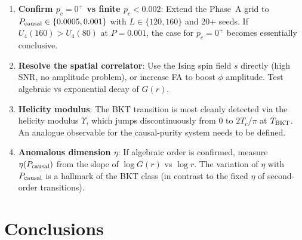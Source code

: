 \documentclass[12pt,a4paper]{article}
\begin{document}
\begin{enumerate}
  \item \textbf{Confirm $p_c = 0^+$ vs finite $p_c < 0.002$}:
    Extend the Phase~A grid to $P_{\rm causal} \in \{0.0005, 0.001\}$
    with $L \in \{120, 160\}$ and 20+ seeds.
    If $U_4(160) > U_4(80)$ at $P = 0.001$, the case for $p_c = 0^+$ becomes
    essentially conclusive.

  \item \textbf{Resolve the spatial correlator}:
    Use the Ising spin field $s$ directly
    (high SNR, no amplitude problem),
    or increase FA to boost $\phi$ amplitude.
    Test algebraic vs exponential decay of $G(r)$.

  \item \textbf{Helicity modulus}:
    The BKT transition is most cleanly detected via the helicity modulus
    $\Upsilon$, which jumps discontinuously from 0 to $2T_c/\pi$ at $T_{\rm BKT}$.
    An analogue observable for the causal-purity system needs to be defined.

  \item \textbf{Anomalous dimension $\eta$}:
    If algebraic order is confirmed,
    measure $\eta(P_{\rm causal})$ from the slope of $\log G(r)$ vs $\log r$.
    The variation of $\eta$ with $P_{\rm causal}$ is a hallmark of the BKT class
    (in contrast to the fixed $\eta$ of second-order transitions).
\end{enumerate}

\section{Conclusions}
\end{document}
